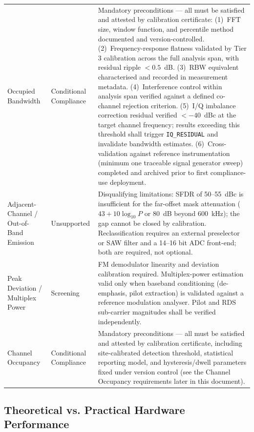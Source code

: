 \documentclass[11pt]{article}
\begin{document}
\begin{longtable}{L{3.2cm}L{2.2cm}L{8.6cm}}
Occupied Bandwidth & Conditional Compliance &
Mandatory preconditions --- all must be satisfied and attested by calibration certificate: (1)~FFT size, window function, and percentile method documented and version-controlled. (2)~Frequency-response flatness validated by Tier 3 calibration across the full analysis span, with residual ripple $< 0.5$~dB. (3)~RBW equivalent characterised and recorded in measurement metadata. (4)~Interference control within analysis span verified against a defined co-channel rejection criterion. (5)~I/Q imbalance correction residual verified $<-40$~dBc at the target channel frequency; results exceeding this threshold shall trigger \texttt{IQ\_RESIDUAL} and invalidate bandwidth estimates. (6)~Cross-validation against reference instrumentation (minimum one traceable signal generator sweep) completed and archived prior to first compliance-use deployment. \\

Adjacent-Channel / Out-of-Band Emission & Unsupported &
Disqualifying limitations: SFDR of 50--55~dBc is insufficient for the far-offset mask attenuation ($43 + 10\log_{10} P$ or 80~dB beyond 600~kHz); the gap cannot be closed by calibration. Reclassification requires an external preselector or SAW filter and a 14--16 bit ADC front-end; both are required, not optional. \\

Peak Deviation / Multiplex Power & Screening &
FM demodulator linearity and deviation calibration required. Multiplex-power estimation valid only when baseband conditioning (de-emphasis, pilot extraction) is validated against a reference modulation analyser. Pilot and RDS sub-carrier magnitudes shall be verified independently. \\

Channel Occupancy & Conditional Compliance &
Mandatory preconditions --- all must be satisfied and attested by calibration certificate, including site-calibrated detection threshold, statistical reporting model, and hysteresis/dwell parameters fixed under version control (see the Channel Occupancy requirements later in this document). \\

\end{longtable}

\subsection*{Theoretical vs. Practical Hardware Performance}
\end{document}
